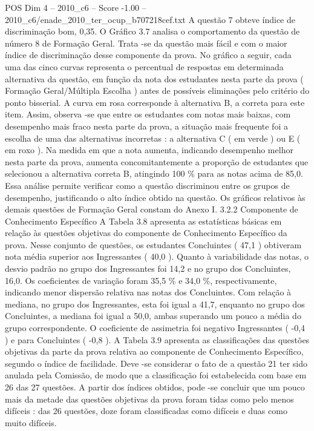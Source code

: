 \begin{textsample}{POS Dim 4 – 2010\_c6 – Score -1.00 – 2010\_c6/enade\_2010\_ter\_ocup\_b707218cef.txt}
A questão 7 obteve índice de discriminação bom, 0,35.
O Gráfico 3.7 analisa o comportamento da questão de número 8 de Formação Geral.
Trata -se da questão mais fácil e com o maior índice de discriminação desse componente da prova.
No gráfico a seguir, cada uma das cinco curvas representa o percentual de respostas em determinada alternativa da questão, em função da nota dos estudantes nesta parte da prova ( Formação Geral/Múltipla Escolha ) antes de possíveis eliminações pelo critério do ponto bisserial.
A curva em rosa corresponde à alternativa B, a correta para este item.
Assim, observa -se que entre os estudantes com notas mais baixas, com desempenho mais fraco nesta parte da prova, a situação mais frequente foi a escolha de uma das alternativas incorretas : a alternativa C ( em verde ) ou E ( em roxo ).
Na medida em que a nota aumenta, indicando desempenho melhor nesta parte da prova, aumenta concomitantemente a proporção de estudantes que selecionou a alternativa correta B, atingindo 100 \% para as notas acima de 85,0.
Essa análise permite verificar como a questão discriminou entre os grupos de desempenho, justificando o alto índice obtido na questão.
Os gráficos relativos às demais questões de Formação Geral constam do Anexo I. 3.2.2 Componente de Conhecimento Específico A Tabela 3.8 apresenta as estatísticas básicas em relação às questões objetivas do componente de Conhecimento Específico da prova.
Nesse conjunto de questões, os estudantes Concluintes ( 47,1 ) obtiveram nota média superior aos Ingressantes ( 40,0 ).
Quanto à variabilidade das notas, o desvio padrão no grupo dos Ingressantes foi 14,2 e no grupo dos Concluintes, 16,0.
Os coeficientes de variação foram 35,5 \% e 34,0 \%, respectivamente, indicando menor dispersão relativa nas notas dos Concluintes.
Com relação à mediana, no grupo dos Ingressantes, esta foi igual a 41,7, enquanto no grupo dos Concluintes, a mediana foi igual a 50,0, ambas superando um pouco a média do grupo correspondente.
O coeficiente de assimetria foi negativo Ingressantes ( -0,4 ) e para Concluintes ( -0,8 ).
A Tabela 3.9 apresenta as classificações das questões objetivas da parte da prova relativa ao componente de Conhecimento Específico, segundo o índice de facilidade.
Deve -se considerar o fato de a questão 21 ter sido anulada pela Comissão, de modo que a classificação foi estabelecida com base em 26 das 27 questões.
A partir dos índices obtidos, pode -se concluir que um pouco mais da metade das questões objetivas da prova foram tidas como pelo menos difíceis : das 26 questões, doze foram classificadas como difíceis e duas como muito difíceis.

\end{textsample}
